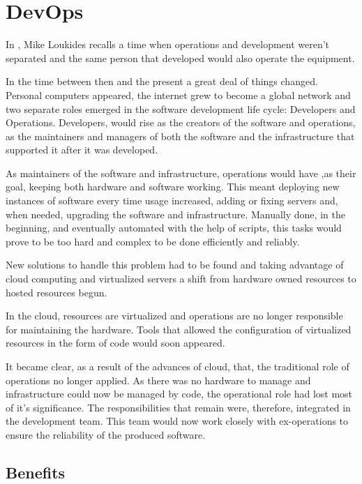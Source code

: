 	\section{DevOps} \label{chap:stateoftheart:sec:devops}
		
        In  \cite{Loukides2012}, Mike Loukides recalls a time when operations and development weren't separated and the same person that developed would also operate the equipment.  
        
        In the time between then and the present a great deal of things changed. Personal computers appeared, the internet grew to become a global network and two separate roles emerged in the software development life cycle: Developers and Operations. Developers, would rise as the creators of the software and operations, as the maintainers and managers of both the software and the infrastructure that supported it after it was developed.
        
        As maintainers of the software and infrastructure, operations would have ,as their goal, keeping both hardware and software working. This meant deploying new instances of software every time usage increased, adding or fixing servers and, when needed, upgrading the software and infrastructure. Manually done, in the beginning, and eventually automated with the help of scripts, this tasks would prove to be too hard and complex to be done efficiently and reliably. 
        
        New solutions to handle this problem had to be found and taking advantage of cloud computing and virtualized servers a shift from hardware owned resources to hosted resources begun.
        
        In the cloud, resources are virtualized and operations are no longer responsible for maintaining the hardware. Tools that allowed the configuration of virtualized resources in the form of code would soon appeared.
        
        	It became clear, as a result of the advances of cloud, that, the traditional role of operations no longer applied. As there was no hardware to manage and infrastructure could now be managed by code, the operational role had lost most of it's significance. The responsibilities that remain were, therefore, integrated in the development team. This team would now work closely with ex-operations to ensure the reliability of the produced software.   
	
      \subsection{Benefits} \label{chap:stateoftheheart:sec:devops:benefits}
      

